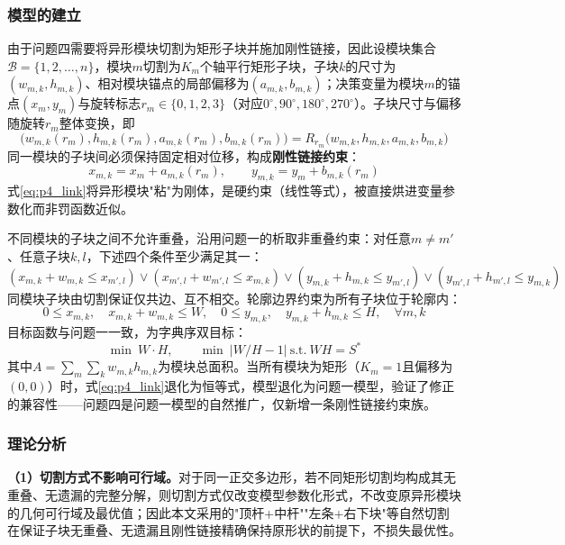 \documentclass{JXUSTmodeling}
\begin{document}
\subsubsection{模型的建立}
由于问题四需要将异形模块切割为矩形子块并施加刚性链接，因此设模块集合$\mathcal{B}=\{1,2,\ldots,n\}$，模块$m$切割为$K_m$个轴平行矩形子块，子块$k$的尺寸为$(w_{m,k},h_{m,k})$、相对模块锚点的局部偏移为$(a_{m,k},b_{m,k})$；决策变量为模块$m$的锚点$(x_m,y_m)$与旋转标志$r_m\in\{0,1,2,3\}$（对应$0^{\circ},90^{\circ},180^{\circ},270^{\circ}$）。子块尺寸与偏移随旋转$r_m$整体变换，即
\begin{equation}
\big(w_{m,k}(r_m),h_{m,k}(r_m),a_{m,k}(r_m),b_{m,k}(r_m)\big)=R_{r_m}\big(w_{m,k},h_{m,k},a_{m,k},b_{m,k}\big)
\label{eq:p4_rot}
\end{equation}
同一模块的子块间必须保持固定相对位移，构成\textbf{刚性链接约束}：
\begin{equation}
x_{m,k}=x_m+a_{m,k}(r_m),\qquad y_{m,k}=y_m+b_{m,k}(r_m)
\label{eq:p4_link}
\end{equation}
式\eqref{eq:p4_link}将异形模块"粘"为刚体，是硬约束（线性等式），被直接烘进变量参数化而非罚函数近似。

不同模块的子块之间不允许重叠，沿用问题一的析取非重叠约束：对任意$m\ne m'$、任意子块$k,l$，下述四个条件至少满足其一：
\begin{equation}
(x_{m,k}+w_{m,k}\le x_{m',l})\vee(x_{m',l}+w_{m',l}\le x_{m,k})\vee(y_{m,k}+h_{m,k}\le y_{m',l})\vee(y_{m',l}+h_{m',l}\le y_{m,k})
\label{eq:p4_nonoverlap}
\end{equation}
同模块子块由切割保证仅共边、互不相交。轮廓边界约束为所有子块位于轮廓内：
\begin{equation}
0\le x_{m,k},\quad x_{m,k}+w_{m,k}\le W,\quad 0\le y_{m,k},\quad y_{m,k}+h_{m,k}\le H,\quad \forall m,k
\label{eq:p4_boundary}
\end{equation}
目标函数与问题一一致，为字典序双目标：
\begin{equation}
\min\ W\cdot H,\qquad \min\ \Big|W/H-1\Big|\ \text{s.t.}\ WH=S^*
\label{eq:p4_obj}
\end{equation}
其中$A=\sum_{m}\sum_k w_{m,k}h_{m,k}$为模块总面积。当所有模块为矩形（$K_m=1$且偏移为$(0,0)$）时，式\eqref{eq:p4_link}退化为恒等式，模型退化为问题一模型，验证了修正的兼容性——问题四是问题一模型的自然推广，仅新增一条刚性链接约束族。

\subsubsection{理论分析}
\textbf{（1）切割方式不影响可行域。}对于同一正交多边形，若不同矩形切割均构成其无重叠、无遗漏的完整分解，则切割方式仅改变模型参数化形式，不改变原异形模块的几何可行域及最优值；因此本文采用的"顶杆+中杆""左条+右下块"等自然切割在保证子块无重叠、无遗漏且刚性链接精确保持原形状的前提下，不损失最优性。
\end{document}
